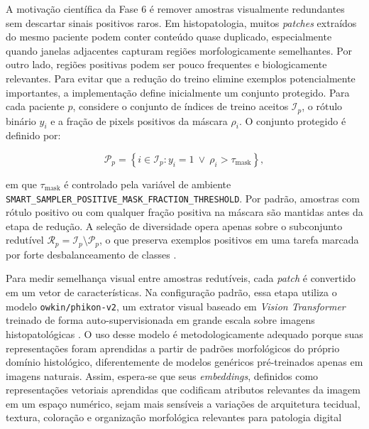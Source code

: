 A motivação científica da Fase 6 é remover amostras visualmente redundantes sem
descartar sinais positivos raros. Em histopatologia, muitos \textit{patches}
extraídos do mesmo paciente podem conter conteúdo quase duplicado, especialmente
quando janelas adjacentes capturam regiões morfologicamente semelhantes. Por
outro lado, regiões positivas podem ser pouco frequentes e biologicamente
relevantes. Para evitar que a redução do treino elimine exemplos potencialmente
importantes, a implementação define inicialmente um conjunto protegido. Para cada
paciente $p$, considere o conjunto de índices de treino aceitos
$\mathcal{I}_p$, o rótulo binário $y_i$ e a fração de pixels positivos da máscara
$\rho_i$. O conjunto protegido é definido por:

\begin{equation}
    \mathcal{P}_p =
    \left\{
        i \in \mathcal{I}_p :
        y_i = 1
        \ \lor\
        \rho_i > \tau_{\mathrm{mask}}
    \right\},
    \label{eq:stage6_protected_set}
\end{equation}

em que $\tau_{\mathrm{mask}}$ é controlado pela variável de ambiente
\texttt{SMART\_SAMPLER\_POSITIVE\_MASK\_FRACTION\_THRESHOLD}. Por padrão,
amostras com rótulo positivo ou com qualquer fração positiva na máscara são
mantidas antes da etapa de redução. A seleção de diversidade opera apenas sobre
o subconjunto redutível
$\mathcal{R}_p=\mathcal{I}_p\setminus\mathcal{P}_p$, o que preserva exemplos
positivos em uma tarefa marcada por forte desbalanceamento de classes
\cite{he2009imbalanced}.

Para medir semelhança visual entre amostras redutíveis, cada \textit{patch} é
convertido em um vetor de características. Na configuração padrão, essa etapa
utiliza o modelo \texttt{owkin/phikon-v2}, um extrator visual baseado em
\textit{Vision Transformer} treinado de forma auto-supervisionada em grande
escala sobre imagens histopatológicas \cite{filiot2024phikonv2}. O uso desse
modelo é metodologicamente adequado porque suas representações foram aprendidas
a partir de padrões morfológicos do próprio domínio histológico, diferentemente
de modelos genéricos pré-treinados apenas em imagens naturais. Assim, espera-se que seus \textit{embeddings}, definidos como representações vetoriais aprendidas que codificam atributos relevantes da imagem em um espaço numérico, sejam mais sensíveis a variações de arquitetura tecidual, textura, coloração e organização morfológica relevantes para patologia digital

